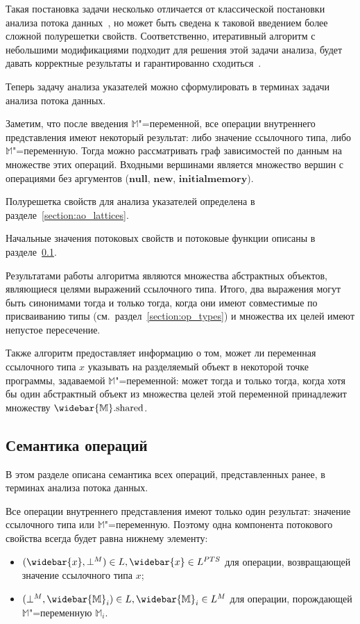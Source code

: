 \documentclass[14pt,titlepage,draft]{extarticle}
\newcommand{\M}{\ensuremath{\mathbb{M}}}
\newcommand{\Ms}{\ensuremath{\mathbb{\widebar{M}}}}
\newcommand{\Mf}[1]{\ensuremath{\mathrm{#1}}}
\newcommand{\op}[1]{\mathbf{#1}}
\newcommand{\pts}[1]{\widebar{#1}}
\begin{document}
    Такая постановка задачи несколько отличается от классической постановки
    анализа потока данных~\cite{muchnick, nielson}, но может быть сведена к
    таковой введением более сложной полурешетки свойств.
    Соответственно, итеративный алгоритм с небольшими модификациями подходит
    для решения этой задачи анализа, будет давать корректные результаты и
    гарантированно сходиться~\cite{kildall}.

    Теперь задачу анализа указателей можно сформулировать в терминах задачи
    анализа потока данных.

    Заметим, что после введения \M"=переменной, все операции внутреннего
    представления имеют некоторый результат: либо значение ссылочного типа,
    либо \M"=переменную. Тогда можно рассматривать граф зависимостей по данным
    на множестве этих операций. Входными вершинами является множество вершин с
    операциями без аргументов
    ($\op{null}$, $\op{new}$, $\op{initialmemory}$).

    Полурешетка свойств для анализа указателей определена в
    разделе~\ref{section:ao_lattices}.

    Начальные значения потоковых свойств и потоковые функции описаны
    в разделе~\ref{section:flow_functions}.

    Результатами работы алгоритма являются множества абстрактных объектов,
    являющиеся целями выражений ссылочного типа. Итого, два выражения могут быть
    синонимами тогда и только тогда, когда они имеют совместимые по
    присваиванию типы (см.~раздел~\ref{section:op_types}) и множества их целей
    имеют непустое пересечение.

    Также алгоритм предоставляет информацию о том, может ли переменная
    ссылочного типа $x$ указывать на разделяемый объект в некоторой точке
    программы, задаваемой \M"=переменной: может тогда и только тогда, когда
    хотя бы один абстрактный объект из множества целей этой переменной
    принадлежит множеству $\Ms.\Mf{shared}$.

  \subsection{Семантика операций}
    \label{section:flow_functions}

    В этом разделе описана семантика всех операций, представленных ранее, в
    терминах анализа потока данных.

    Все операции внутреннего представления имеют только один результат:
    значение ссылочного типа или \M"=переменную. Поэтому одна компонента
    потокового свойства всегда будет равна нижнему элементу:
    \begin{itemize}
      \item $(\pts{x}, \bot^M) \in L, \pts{x} \in L^{PTS}$ для операции,
            возвращающей значение ссылочного типа $x$;
      \item $(\bot^M, \Ms_i) \in L, \Ms_i \in L^M$ для операции, порождающей
            \M"=переменную $\M_i$.
    \end{itemize}
\end{document}
